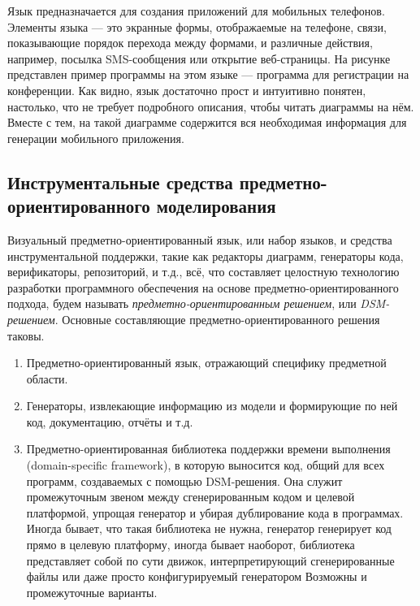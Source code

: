 Язык предназначается для создания приложений для мобильных телефонов. 
Элементы языка --- это экранные формы, отображаемые на телефоне, связи, 
показывающие порядок перехода между формами, и различные действия, например, 
посылка SMS-сообщения или открытие веб-страницы. На рисунке представлен пример 
программы на этом языке --- программа для регистрации на конференции. 
Как видно, язык достаточно прост и интуитивно понятен, настолько, что не требует 
подробного описания, чтобы читать диаграммы на нём. Вместе с тем, на такой 
диаграмме содержится вся необходимая информация для генерации мобильного 
приложения.

\subsection{Инструментальные средства предметно-ориентированного моделирования}
Визуальный предметно-ориентированный язык, или набор языков, и средства 
инструментальной поддержки, такие как редакторы диаграмм, генераторы кода, 
верификаторы, репозиторий, и т.д., всё, что составляет целостную технологию 
разработки программного обеспечения на основе предметно-ориентированного 
подхода, будем называть \textit{предметно-ориентированным решением}, или \textit{DSM-решением}. 
Основные составляющие предметно-ориентированного решения таковы.

\begin{enumerate}
	\item Предметно-ориентированный язык, отражающий специфику предметной области.
	\item Генераторы, извлекающие информацию из модели и формирующие по ней код, 
		документацию, отчёты и т.д.
	\item Предметно-ориентированная библиотека поддержки времени выполнения 
		(domain-specific framework), в которую выносится код, общий для всех 
		программ, создаваемых с помощью DSM-решения. Она служит промежуточным звеном 
		между сгенерированным кодом и целевой платформой, упрощая генератор и убирая 
		дублирование кода в программах. Иногда бывает, что такая библиотека не 
		нужна, генератор генерирует код прямо в целевую платформу, иногда бывает 
		наоборот, библиотека представляет собой по сути движок, интерпретирующий 
		сгенерированные файлы или даже просто конфигурируемый генератором 
		Возможны и промежуточные варианты.
\end{enumerate}

